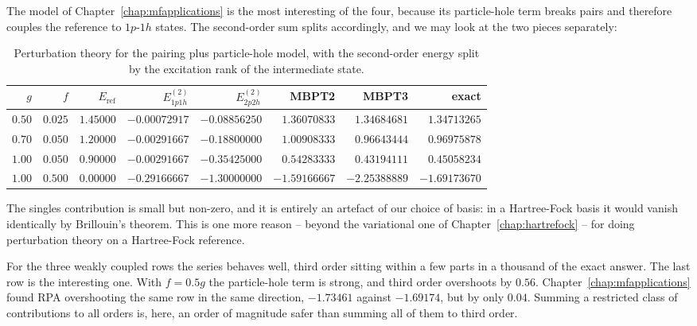 The model of Chapter~\ref{chap:mfapplications} is the most interesting of the
four, because its particle-hole term breaks pairs and therefore couples the
reference to $1p$-$1h$ states.  The second-order sum splits accordingly, and
we may look at the two pieces separately:

\begin{table}[h]
\centering
\renewcommand{\arraystretch}{1.25}
\setlength{\tabcolsep}{5pt}
\small
\begin{tabular}{rrrrrrrr}
\toprule
$g$ & $f$ & $E_{\mathrm{ref}}$ & $E^{(2)}_{1p1h}$
  & $E^{(2)}_{2p2h}$ & MBPT2 & MBPT3 & exact\\
\midrule
$0.50$ & $0.025$ & $1.45000$ & $-0.00072917$ & $-0.08856250$
  & $1.36070833$ & $1.34684681$ & $1.34713265$\\
$0.70$ & $0.050$ & $1.20000$ & $-0.00291667$ & $-0.18800000$
  & $1.00908333$ & $0.96643444$ & $0.96975878$\\
$1.00$ & $0.050$ & $0.90000$ & $-0.00291667$ & $-0.35425000$
  & $0.54283333$ & $0.43194111$ & $0.45058234$\\
$1.00$ & $0.500$ & $0.00000$ & $-0.29166667$ & $-1.30000000$
  & $-1.59166667$ & $-2.25388889$ & $-1.69173670$\\
\bottomrule
\end{tabular}
\caption{Perturbation theory for the pairing plus particle-hole model, with
the second-order energy split by the excitation rank of the intermediate
state.}
\label{tab:mbptph}
\end{table}

The singles contribution is small but non-zero, and it is entirely an
artefact of our choice of basis: in a Hartree-Fock basis it would vanish
identically by Brillouin's theorem.  This is one more reason -- beyond the
variational one of Chapter~\ref{chap:hartrefock} -- for doing perturbation
theory on a Hartree-Fock reference.

For the three weakly coupled rows the series behaves well, third order
sitting within a few parts in a thousand of the exact answer.  The last row
is the interesting one.  With $f=0.5g$ the particle-hole term is strong, and
third order overshoots by $0.56$.  Chapter~\ref{chap:mfapplications} found
RPA overshooting the same row in the same direction, $-1.73461$ against
$-1.69174$, but by only $0.04$.  Summing a restricted class of contributions
to all orders is, here, an order of magnitude safer than summing all of them
to third order.

